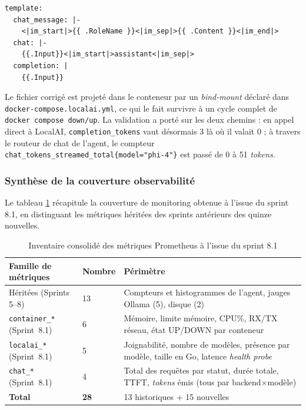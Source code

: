        \begin{lstlisting}[style=yaml, caption={Correction du \textit{template} ChatML-with-im\_sep de Phi-4}, label={lst:phi4_fix}]
template:
  chat_message: |-
    <|im_start|>{{ .RoleName }}<|im_sep|>{{ .Content }}<|im_end|>
  chat: |-
    {{.Input}}<|im_start|>assistant<|im_sep|>
  completion: |
    {{.Input}}
        \end{lstlisting}

        Le fichier corrigé est projeté dans le conteneur par un \textit{bind-mount}
        déclaré dans \texttt{docker-compose.\allowbreak{}localai.\allowbreak{}yml}, ce qui le fait survivre
        à un cycle complet de \texttt{docker compose down/\allowbreak{}up}. La validation a porté
        sur les deux chemins : en appel direct à LocalAI, \texttt{completion\_\allowbreak{}tokens}
        vaut désormais 3 là où il valait 0 ; à travers le routeur de chat de l'agent,
        le compteur \texttt{chat\_\allowbreak{}tokens\_\allowbreak{}streamed\_\allowbreak{}total\{model="phi-4"\}} est passé
        de 0 à 51 \textit{tokens}.

        \subsubsection{Synthèse de la couverture observabilité}

        Le tableau \ref{tab:metrics_8_1_summary} récapitule la couverture de
        monitoring obtenue à l'issue du sprint 8.1, en distinguant les métriques
        héritées des sprints antérieurs des quinze nouvelles.

        \begin{table}[H]
        \centering
        \footnotesize
        \begin{tabular}{|p{3.8cm}|p{2cm}|p{8.5cm}|}
        \hline
        \textbf{Famille de métriques} & \textbf{Nombre} & \textbf{Périmètre} \\
        \hline
        Héritées (Sprints 5--8) & 13 & Compteurs et histogrammes de l'agent, jauges Ollama (5), disque (2) \\
        \hline
        \texttt{container\_*} (Sprint~8.1) & 6 & Mémoire, limite mémoire, CPU\%, RX/TX réseau, état UP/DOWN par conteneur \\
        \hline
        \texttt{localai\_*} (Sprint~8.1) & 5 & Joignabilité, nombre de modèles, présence par modèle, taille en Go, latence \textit{health probe} \\
        \hline
        \texttt{chat\_*} (Sprint~8.1) & 4 & Total des requêtes par statut, durée totale, TTFT, \textit{tokens} émis (tous par backend×modèle) \\
        \hline
        \textbf{Total} & \textbf{28} & 13 historiques + 15 nouvelles \\
        \hline
        \end{tabular}
        \caption{Inventaire consolidé des métriques Prometheus à l'issue du sprint 8.1}
        \label{tab:metrics_8_1_summary}
        \end{table}

